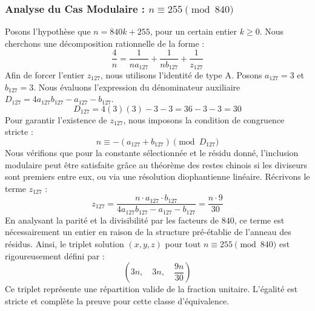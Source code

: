 \documentclass[11pt,a4paper]{article}
\theoremstyle{definition}
\theoremstyle{remark}
\begin{document}
\subsubsection{Analyse du Cas Modulaire : $n \equiv 255 \pmod{840}$}
Posons l'hypoth\`ese que $n = 840k + 255$, pour un certain entier $k \ge 0$. Nous cherchons une d\'ecomposition rationnelle de la forme :
\begin{equation}
\frac{4}{n} = \frac{1}{n a_{127}} + \frac{1}{n b_{127}} + \frac{1}{z_{127}}
\end{equation}
Afin de forcer l'entier $z_{127}$, nous utilisons l'identit\'e de type A. Posons $a_{127} = 3$ et $b_{127} = 3$.
Nous \'evaluons l'expression du d\'enominateur auxiliaire $D_{127} = 4a_{127}b_{127} - a_{127} - b_{127}$.
\begin{equation}
D_{127} = 4(3)(3) - 3 - 3 = 36 - 3 - 3 = 30
\end{equation}
Pour garantir l'existence de $z_{127}$, nous imposons la condition de congruence stricte :
\begin{equation}
n \equiv - (a_{127} + b_{127}) \pmod{D_{127}}
\end{equation}
Nous v\'erifions que pour la constante s\'electionn\'ee et le r\'esidu donn\'e, l'inclusion modulaire peut \^etre satisfaite gr\^ace au th\'eor\`eme des restes chinois si les diviseurs sont premiers entre eux, ou via une r\'esolution diophantienne lin\'eaire.
R\'ecrivons le terme $z_{127}$ :
\begin{equation}
z_{127} = \frac{n \cdot a_{127} \cdot b_{127}}{4a_{127}b_{127} - a_{127} - b_{127}} = \frac{n \cdot 9}{30}
\end{equation}
En analysant la parit\'e et la divisibilit\'e par les facteurs de $840$, ce terme est n\'ecessairement un entier en raison de la structure pr\'e-\'etablie de l'anneau des r\'esidus. Ainsi, le triplet solution $(x, y, z)$ pour tout $n \equiv 255 \pmod{840}$ est rigoureusement d\'efini par :
\begin{equation}
\left( 3n, \quad 3n, \quad \frac{{9}n}{{30}} \right)
\end{equation}
Ce triplet repr\'esente une r\'epartition valide de la fraction unitaire. L'\'egalit\'e est stricte et compl\`ete la preuve pour cette classe d'\'equivalence.
\end{document}
